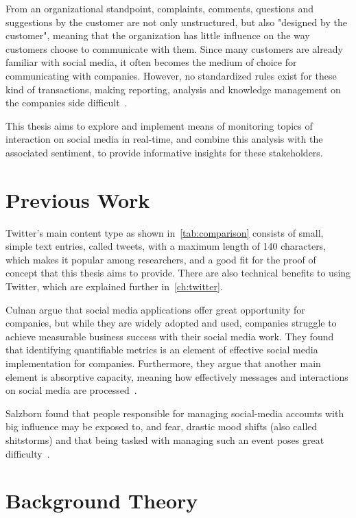 From an organizational standpoint, complaints, comments, questions and suggestions by the customer are not only unstructured,
but also "designed by the customer", meaning that the organization has little influence on the way customers choose to communicate with them.
Since many customers are already familiar with social media, it often becomes the medium of choice for communicating with companies.
However, no standardized rules exist for these kind of transactions, making reporting, analysis and knowledge management on the companies side difficult~\cite{Culnan2015}.
\par
This thesis aims to explore and implement means of monitoring topics of interaction on social media in real-time,
and combine this analysis with the associated sentiment, to provide informative insights for these stakeholders.

\section{Previous Work}
\label{sec:previousWork}

Twitter's main content type as shown in~\ref{tab:comparison} consists of small, simple text entries, called tweets, with a maximum length of 140 characters,
which makes it popular among researchers, and a good fit for the proof of concept that this thesis aims to provide.
There are also technical benefits to using Twitter, which are explained further in~\ref{ch:twitter}.
\par
Culnan \etAl argue that social media applications offer great opportunity for companies,
but while they are widely adopted and used,
companies struggle to achieve measurable business success with their social media work.
They found that identifying quantifiable metrics is an element of effective social media implementation for companies.
Furthermore, they argue that another main element is absorptive capacity, meaning how effectively messages and
interactions on social media are processed~\cite{Culnan2015}.
\par
Salzborn \etAl found that people responsible for managing social-media accounts with big influence may be exposed to, and fear,
drastic mood shifts (also called shitstorms) and that being tasked with managing such an event poses great difficulty~\cite{Salzborn2015}.

\section{Background Theory}
\label{sec:backgroundTheory}

